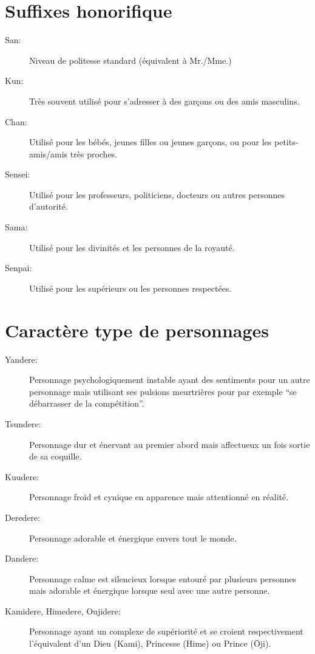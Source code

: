 \section{Suffixes honorifique}

\begin{description}
	\item[San:] Niveau de politesse standard (équivalent à Mr./Mme.)
	\item[Kun:] Très souvent utilisé pour s'adresser à des garçons ou des amis
		masculins.
	\item[Chan:] Utilisé pour les bébés, jeunes filles ou jeunes garçons, ou
		pour les petits-amis/amis très proches.
	\item[Sensei:] Utilisé pour les professeurs, politiciens, docteurs ou
		autres personnes d'autorité.
	\item[Sama:] Utilisé pour les divinités et les personnes de la royauté.
	\item[Senpai:] Utilisé pour les supérieurs ou les personnes respectées.
\end{description}

\section{Caractère type de personnages}

\begin{description}
	\item[Yandere:] Personnage psychologiquement instable ayant des
		sentiments pour un autre personnage mais utilisant ses pulsions
		meurtrières pour par exemple ``se débarrasser de la compétition''.
	\item[Tsundere:] Personnage dur et énervant au premier abord mais
		affectueux un fois sortie de sa coquille.
	\item[Kuudere:] Personnage froid et cynique en apparence mais attentionné
		en réalité.
	\item[Deredere:] Personnage adorable et énergique envers tout le monde.
	\item[Dandere:] Personnage calme est silencieux lorsque entouré par
		plusieurs personnes mais adorable et énergique lorsque seul avec une
		autre personne.
	\item[Kamidere, Himedere, Oujidere:] Personnage ayant un complexe
		de supériorité et se croient respectivement l'équivalent d'un
		Dieu (Kami), Princesse (Hime) ou Prince (\=Oji).
\end{description}

